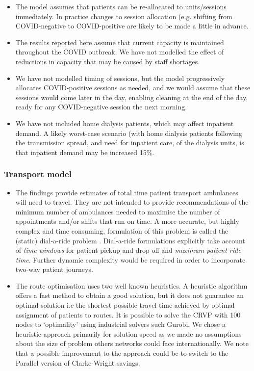 \begin{multicols}{2}
\begin{itemize}
    \item The model assumes that patients can be re-allocated to units/sessions immediately. In practice changes to session allocation (e.g. shifting from COVID-negative to COVID-positive are likely to be made a little in advance. 
    
    \item The results reported here assume that current capacity is maintained throughout the COVID outbreak. We have not modelled the effect of reductions in capacity that may be caused by staff shortages.
    
    \item We have not modelled timing of sessions, but the model progressively allocates COVID-positive sessions as needed, and we would assume that these sessions would come later in the day, enabling cleaning at the end of the day, ready for any COVID-negative session the next morning.
    
    \item We have not included home dialysis patients, which may affect inpatient demand. A likely worst-case scenario (with home dialysis patients following the transmission spread, and need for inpatient care, of the dialysis units, is that inpatient demand may be increased 15\%.
    
\end{itemize}


\subsubsection{Transport model}

\begin{itemize}
    \item The findings provide estimates of total time patient transport ambulances will need to travel. They are not intended to provide recommendations of the minimum number of ambulances needed to maximise the number of appointments and/or shifts that run on time. A more accurate, but highly complex and time consuming, formulation of this problem is called the (static) dial-a-ride problem \cite{dialaride2007}. Dial-a-ride formulations explicitly take account of \textit{time windows} for patient pickup and drop-off and \textit{maximum patient ride-time}. Further dynamic complexity would be required in order to incorporate two-way patient journeys. 
    
    \item The route optimisation uses two well known heuristics. A heuristic algorithm offers a fast method to obtain a good solution, but it does not guarantee an optimal solution i.e the shortest possible travel time achieved by optimal assignment of patients to routes. It is possible to solve the CRVP with 100 nodes to `optimality' using industrial solvers such Gurobi. We chose a heuristic approach primarily for solution speed as we made no assumptions about the size of problem others networks could face internationally. We note that a possible improvement to the approach could be to switch to the Parallel version of Clarke-Wright savings.
    

\end{itemize}
\end{multicols}
